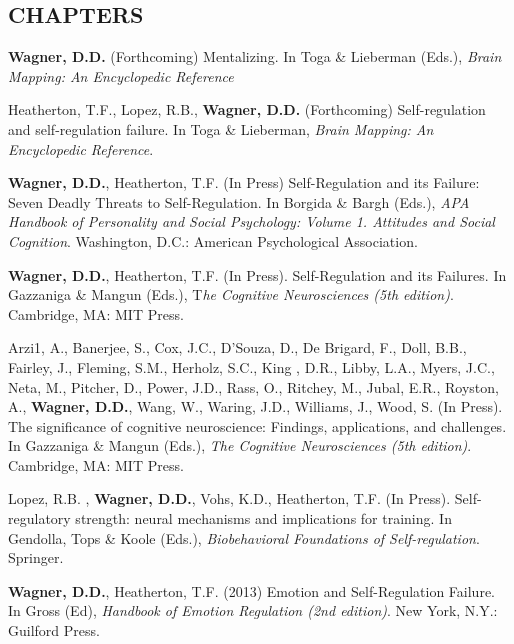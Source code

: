 \documentclass[11pt,letter,roman]{moderncv}
\begin{document}
\subsection{CHAPTERS}
\begin{bibenum}

\item \textbf{Wagner, D.D.} (Forthcoming) Mentalizing. In Toga \& Lieberman (Eds.), \emph{Brain Mapping: An Encyclopedic Reference}

\item Heatherton, T.F., Lopez, R.B., \textbf{Wagner, D.D.} (Forthcoming) Self-regulation and self-regulation failure. In Toga \& Lieberman, \emph{Brain Mapping: An Encyclopedic Reference}. 

\item \textbf{Wagner, D.D.}, Heatherton, T.F. (In Press) Self-Regulation and its Failure: Seven Deadly Threats to Self-Regulation. In Borgida \& Bargh (Eds.), \emph{APA Handbook of Personality and Social Psychology: Volume 1. Attitudes and Social Cognition}. Washington, D.C.:  American Psychological Association.

\item \textbf{Wagner, D.D.}, Heatherton, T.F. (In Press). Self-Regulation and its Failures.  
In Gazzaniga \& Mangun (Eds.), T\emph{he Cognitive Neurosciences (5th edition)}. Cambridge, MA: MIT Press.

\item Arzi1, A., Banerjee, S., Cox, J.C., D'Souza, D., De Brigard, F., Doll, B.B., Fairley, J., Fleming, S.M., Herholz, S.C., King , D.R., Libby, L.A., Myers, J.C., Neta, M., Pitcher, D., Power, J.D., Rass, O., Ritchey, M., Jubal, E.R., Royston, A., \textbf{Wagner, D.D.}, Wang, W., Waring, J.D., Williams, J., Wood, S. (In Press). The significance of cognitive neuroscience: Findings, applications, and challenges. In Gazzaniga \& Mangun (Eds.), \emph{The Cognitive Neurosciences (5th edition)}. Cambridge, MA: MIT Press.

\item Lopez, R.B. , \textbf{Wagner, D.D.}, Vohs, K.D., Heatherton, T.F. (In Press). Self-regulatory strength: neural mechanisms and implications for training. In Gendolla, Tops \& Koole (Eds.), \emph{Biobehavioral Foundations of Self-regulation}. Springer.

\item \textbf{Wagner, D.D.}, Heatherton, T.F. (2013) Emotion and Self-Regulation Failure. In Gross (Ed), \emph{Handbook of Emotion Regulation (2nd edition)}. New York, N.Y.: Guilford Press. 


\end{bibenum}
\end{document}
